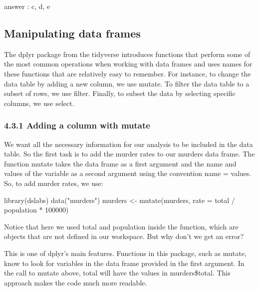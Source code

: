 \documentclass[
]{article}
\newenvironment{Shaded}{\begin{snugshade}}{\end{snugshade}}
\newcommand{\AttributeTok}[1]{\textcolor[rgb]{0.77,0.63,0.00}{#1}}
\newcommand{\DecValTok}[1]{\textcolor[rgb]{0.00,0.00,0.81}{#1}}
\newcommand{\FunctionTok}[1]{\textcolor[rgb]{0.00,0.00,0.00}{#1}}
\newcommand{\NormalTok}[1]{#1}
\newcommand{\OtherTok}[1]{\textcolor[rgb]{0.56,0.35,0.01}{#1}}
\newcommand{\SpecialCharTok}[1]{\textcolor[rgb]{0.00,0.00,0.00}{#1}}
\newcommand{\StringTok}[1]{\textcolor[rgb]{0.31,0.60,0.02}{#1}}
\begin{document}
answer : c, d, e

\hypertarget{manipulating-data-frames}{%
\subsection{Manipulating data frames}\label{manipulating-data-frames}}

The dplyr package from the tidyverse introduces functions that perform
some of the most common operations when working with data frames and
uses names for these functions that are relatively easy to remember. For
instance, to change the data table by adding a new column, we use
mutate. To filter the data table to a subset of rows, we use filter.
Finally, to subset the data by selecting specific columns, we use
select.

\hypertarget{adding-a-column-with-mutate}{%
\subsubsection{4.3.1 Adding a column with
mutate}\label{adding-a-column-with-mutate}}

We want all the necessary information for our analysis to be included in
the data table. So the first task is to add the murder rates to our
murders data frame. The function mutate takes the data frame as a first
argument and the name and values of the variable as a second argument
using the convention name = values. So, to add murder rates, we use:

\begin{Shaded}
\begin{Highlighting}[]
\FunctionTok{library}\NormalTok{(dslabs)}
\FunctionTok{data}\NormalTok{(}\StringTok{"murders"}\NormalTok{)}
\NormalTok{murders }\OtherTok{\textless{}{-}} \FunctionTok{mutate}\NormalTok{(murders, }\AttributeTok{rate =}\NormalTok{ total }\SpecialCharTok{/}\NormalTok{ population }\SpecialCharTok{*} \DecValTok{100000}\NormalTok{)}
\end{Highlighting}
\end{Shaded}

Notice that here we used total and population inside the function, which
are objects that are not defined in our workspace. But why don't we get
an error?

This is one of dplyr's main features. Functions in this package, such as
mutate, know to look for variables in the data frame provided in the
first argument. In the call to mutate above, total will have the values
in murders\$total. This approach makes the code much more readable.
\end{document}
